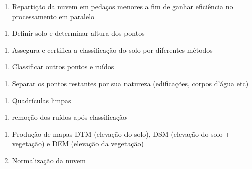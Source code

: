 \documentclass[
]{article}
\providecommand{\tightlist}{%
  \setlength{\itemsep}{0pt}\setlength{\parskip}{0pt}}
\begin{document}
\begin{enumerate}
\def\labelenumi{\roman{enumi}.}
\tightlist
\item
  Repartição da nuvem em pedaços menores a fim de ganhar eficiência no
  processamento em paralelo
\end{enumerate}

\begin{enumerate}
\def\labelenumi{\arabic{enumi}.}
\setcounter{enumi}{3}
\tightlist
\item
  Definir solo e determinar altura dos pontos
\end{enumerate}

\begin{enumerate}
\def\labelenumi{\roman{enumi}.}
\tightlist
\item
  Assegura e certifica a classificação do solo por diferentes métodos
\end{enumerate}

\begin{enumerate}
\def\labelenumi{\arabic{enumi}.}
\setcounter{enumi}{4}
\tightlist
\item
  Classificar outros pontos e ruídos
\end{enumerate}

\begin{enumerate}
\def\labelenumi{\roman{enumi}.}
\tightlist
\item
  Separar os pontos restantes por sua natureza (edificações, corpos
  d'água etc)
\end{enumerate}

\begin{enumerate}
\def\labelenumi{\arabic{enumi}.}
\setcounter{enumi}{5}
\tightlist
\item
  Quadrículas limpas
\end{enumerate}

\begin{enumerate}
\def\labelenumi{\roman{enumi}.}
\tightlist
\item
  remoção dos ruídos após classificação
\end{enumerate}

\begin{enumerate}
\def\labelenumi{\arabic{enumi}.}
\setcounter{enumi}{6}
\item
  Produção de mapas DTM (elevação do solo), DSM (elevação do solo +
  vegetação) e DEM (elevação da vegetação)
\item
  Normalização da nuvem
\end{enumerate}
\end{document}
